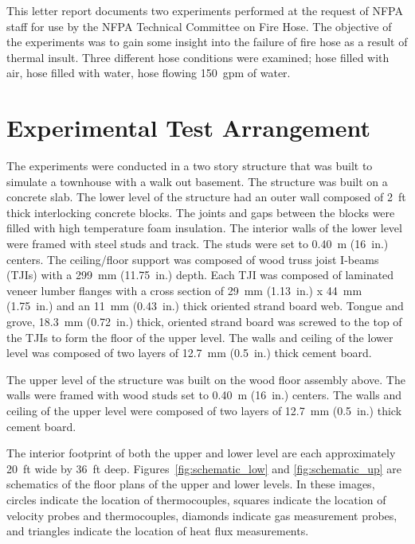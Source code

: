 \documentclass[letterpaper,11pt]{texMemo} %
\begin{document}
\maketitle %


This letter report documents two experiments performed at the request of NFPA staff for use by the NFPA Technical Committee on Fire Hose.   The objective of the experiments was to gain some insight into the failure of fire hose as a result of thermal insult.  Three different hose conditions were examined; hose filled with air, hose filled with water, hose flowing 150~gpm of water. 

\section{Experimental Test Arrangement}
The experiments were conducted in a two story structure that was built to simulate a townhouse with a walk out basement. The structure was built on a concrete slab. The lower level of the structure had an outer wall composed of 2~ft thick interlocking concrete blocks. The joints and gaps between the blocks were filled with high temperature foam insulation. The interior walls of the lower level were framed with steel studs and track. The studs were set to 0.40~m (16~in.) centers. The ceiling/floor support was composed of wood truss joist I-beams (TJIs) with a 299~mm (11.75~in.) depth. Each TJI was composed of laminated veneer lumber flanges with a cross section of 29~mm (1.13~in.) x 44~mm (1.75~in.) and an 11~mm (0.43~in.) thick oriented strand board web. Tongue and grove, 18.3~mm (0.72~in.) thick, oriented strand board was screwed to the top of the TJIs to form the floor of the upper level. The walls and ceiling of the lower level was composed of two layers of 12.7~mm (0.5~in.) thick cement board. 

The upper level of the structure was built on the wood floor assembly above. The walls were framed with wood studs set to 0.40~m (16~in.) centers. The walls and ceiling of the upper level were composed of two layers of 12.7~mm (0.5~in.) thick cement board.   

The interior footprint of both the upper and lower level are each approximately 20~ft wide by 36~ft deep. 	Figures~\ref{fig:schematic_low} and \ref{fig:schematic_up} are schematics of the floor plans of the upper and lower levels. In these images, circles indicate the location of thermocouples, squares indicate the location of velocity probes and thermocouples, diamonds indicate gas measurement probes, and triangles indicate the location of heat flux measurements.
\end{document}
